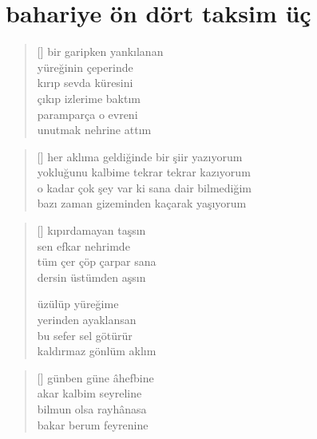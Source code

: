 \documentclass[10pt, openright, twoside]{memoir}
\theoremstyle{definition}
\begin{document}
\chapter{bahariye ön dört taksim üç}
\vspace*{\fill}
\settowidth{\versewidth}{bir garipken yankılanan}
\begin{verse}[\versewidth]
  bir garipken yankılanan \\
  yüreğinin çeperinde \\
  kırıp sevda küresini \\
  çıkıp izlerime baktım \\
  paramparça o evreni \\
  unutmak nehrine attım
\end{verse}
\vspace*{\fill}
%
\newpage
{}
\vspace*{\fill}
\settowidth{\versewidth}{o kadar çok şey var ki sana dair bilmediğim}
\begin{verse}[\versewidth]
  her aklıma geldiğinde bir şiir yazıyorum \\
  yokluğunu kalbime tekrar tekrar kazıyorum \\
  o kadar çok şey var ki sana dair bilmediğim \\
  bazı zaman gizeminden kaçarak yaşıyorum
\end{verse}
\vspace*{\fill}
%
\newpage
{}
\vspace*{\fill}
\settowidth{\versewidth}{tüm çer çöp çarpar sana}
\begin{verse}[\versewidth]
  kıpırdamayan taşsın \\
  sen efkar nehrimde \\
  tüm çer çöp çarpar sana \\
  dersin üstümden aşsın

  üzülüp yüreğime \\
  yerinden ayaklansan \\
  bu sefer sel götürür \\
  kaldırmaz gönlüm aklım
\end{verse}
\vspace*{\fill}
%
\newpage
{}
\vspace*{\fill}
\settowidth{\versewidth}{akar kalbim seyreline}
\begin{verse}[\versewidth]
  günben güne âhefbine \\
  akar kalbim seyreline \\
  bilmun olsa rayhânasa \\
  bakar berum feyrenine
\end{verse}
\end{document}
